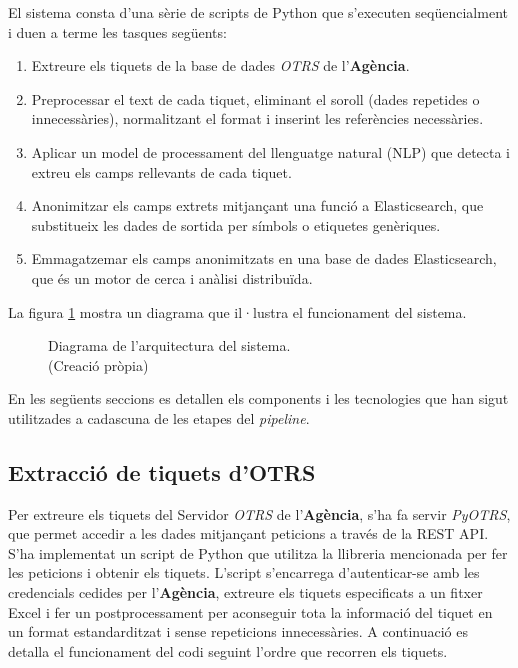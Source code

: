 El sistema consta d'una sèrie de scripts de Python que s'executen seqüencialment i duen a terme les tasques següents:

\begin{enumerate}
     \item Extreure els tiquets de la base de dades \textit{OTRS} de l'\textbf{Agència}.
     \item Preprocessar el text de cada tiquet, eliminant el soroll (dades repetides o innecessàries), normalitzant el format i inserint les referències necessàries.
     \item Aplicar un model de processament del llenguatge natural (NLP) que detecta i extreu els camps rellevants de cada tiquet.
     \item Anonimitzar els camps extrets mitjançant una funció a Elasticsearch, que substitueix les dades de sortida per símbols o etiquetes genèriques.
     \item Emmagatzemar els camps anonimitzats en una base de dades Elasticsearch, que és un motor de cerca i anàlisi distribuïda.
\end{enumerate}

La figura \ref{fig:pipeline} mostra un diagrama que il·lustra el funcionament del sistema.

\begin{figure}[H]
     \centering
     \vspace{1cm} %
     \setlength{\fboxsep}{5pt} %
     \setlength{\fboxrule}{0pt} %
     \caption[Diagrama de l'arquitectura del sistema]{Diagrama de l'arquitectura del sistema. \\ (Creació pròpia)}
     \label{fig:pipeline}
\end{figure}

En les següents seccions es detallen els components i les tecnologies que han sigut utilitzades a cadascuna de les etapes del \textit{pipeline}.
\subsection{Extracció de tiquets d'OTRS}
Per extreure els tiquets del Servidor \textit{OTRS} de l'\textbf{Agència}, s'ha fa servir \textit{PyOTRS}, que permet accedir a les dades mitjançant peticions a través de la REST API. S'ha implementat un script de Python que utilitza la llibreria mencionada per fer les peticions i obtenir els tiquets. L'script s'encarrega d'autenticar-se amb les credencials cedides per l'\textbf{Agència}, extreure els tiquets especificats a un fitxer Excel i fer un postprocessament per aconseguir tota la informació del tiquet en un format estandarditzat i sense repeticions innecessàries. A continuació es detalla el funcionament del codi seguint l'ordre que recorren els tiquets.

